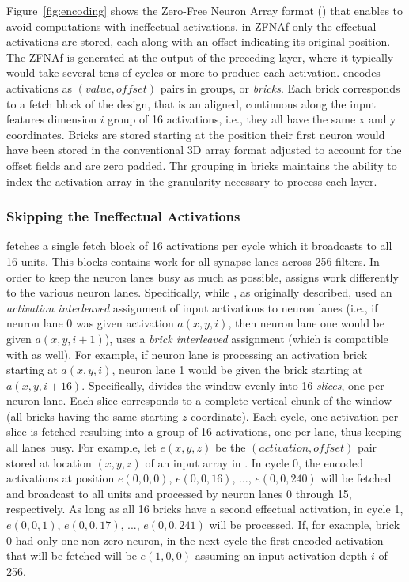 Figure~\ref{fig:encoding} shows the Zero-Free Neuron Array format (\ZFNAf)  that enables \ZF to avoid computations with ineffectual activations. in ZFNAf only the effectual activations are stored, each along with an offset indicating its original position. The ZFNAf is generated at the output of the preceding layer, where it typically would take several tens of cycles or more to produce each activation.  
\ZFNAf encodes activations as $(value, \mathit{offset})$ pairs in groups, or \textit{bricks}. Each brick corresponds to a fetch block of the \BASE design, that is an aligned, continuous along the input features dimension $i$ group of 16 activations, i.e., they all have the same x and y coordinates. Bricks are stored starting at the position their first neuron would have been stored in the conventional 3D array format adjusted to account for the offset fields and are zero padded. Thr grouping in bricks maintains the ability to index the activation array in the granularity necessary to process each layer.

\subsubsection{Skipping the Ineffectual Activations}

%

 



 \BASE fetches a single fetch block of 16 activations per cycle which it broadcasts to all 16 units. This blocks contains work for all synapse lanes across 256 filters. In order to keep the neuron lanes busy as much as possible, \ZF assigns work differently to the various neuron lanes. Specifically, while \BASE, as originally described, used an \textit{activation interleaved} assignment of input activations to neuron lanes (i.e., if neuron lane 0 was given activation $a(x,y,i)$, then neuron lane one would be given $a(x,y,i+1)$), \ZF uses a \textit{brick interleaved} assignment (which is compatible with \BASE as well).  For example, if neuron lane is processing an activation brick starting at $a(x,y,i)$, neuron lane 1 would be given the brick starting at $a(x,y,i+16)$. Specifically, \ZF  divides the window evenly into 16 \textit{slices}, one per neuron lane. Each slice corresponds to a complete vertical chunk of the window (all bricks having the same starting $z$ coordinate). Each cycle, one activation per slice is fetched resulting into a group of 16 activations, one per lane, thus keeping all lanes busy. For example, let $e(x,y,z)$ be the $(activation, \mathit{offset})$ pair stored at location $(x,y,z)$ of an input array in \ZFNAf. In cycle 0, the encoded activations at position $e(0,0,0)$, $e(0,0,16)$, ..., $e(0,0,240)$ will be fetched and broadcast to all units and processed by neuron lanes 0 through 15, respectively. As long as all 16 bricks have a second effectual activation, in cycle 1, $e(0,0,1)$, $e(0,0,17)$, ..., $e(0,0,241)$ will be processed. If, for example, brick 0 had only one non-zero neuron, in the next cycle the first encoded activation that will be fetched will be $e(1,0,0)$ assuming an input activation depth $i$ of 256. 

